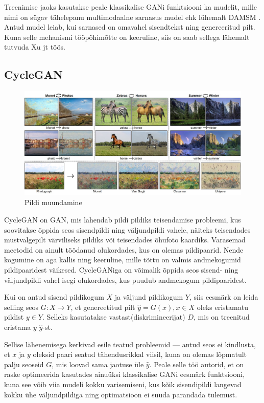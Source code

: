 \documentclass{vilgym}
\begin{document}
	Treenimise jaoks kasutakse peale klassikalise GANi funktsiooni ka mudelit, mille nimi on sügav tähelepanu multimodaalne sarnasus mudel ehk lühemalt DAMSM . Antud mudel leiab, kui sarnased on omavahel sisendtekst ning genereeritud pilt. Kuna selle mehanismi tööpõhimõtte on keeruline, siis on saab sellega lähemalt tutvuda Xu jt töös. \parencite{attngan}

	\subsection{CycleGAN}
	\begin{figure}
		\centering
			\includegraphics[width=\linewidth]{images/cyclegan.jpg}
			\caption{Pildi muundamine}
			\label{fig:cyclegan}
	\end{figure}


	CycleGAN on GAN, mis lahendab pildi pildiks teisendamise probleemi, kus soovitakse õppida seos sisendpildi ning väljundpildi vahele, näiteks teisendades mustvalgepilt värviliseks pildiks või teisendades õhufoto kaardiks. Varasemad meetodid on ainult töödanud olukordades, kus on olemas pildipaarid. Nende kogumine on aga kallis ning keeruline, mille tõttu on valmis andmekogumid pildipaaridest väikesed. CycleGANiga on võimalik õppida seos sisend- ning väljundpildi vahel isegi olukordades, kus puudub andmekogum pildipaaridest. 

	Kui on antud sisend pildikogum $ X $ ja väljund pildikogum $ Y $, siis eesmärk on leida selling seos $ G: X \rightarrow Y $, et genereetitud pilt $ \hat{y} = G(x), x \in X $ oleks eristamatu pildist $ y \in Y $. Selleks kasutatakse vastast(diskrimineerijat) $ D $, mis on treenitud eristama $ y $ $ \hat{y} $-st. 

	Sellise lähenemisega kerkivad esile teatud probleemid --- antud seos ei kindlusta, et $ x $ ja $ y $ oleksid paari seatud tähendusrikkal viisil, kuna on olemas lõpmatult palju seoseid $ G $, mis loovad sama jaotuse üle $ \hat{y} $. Peale selle töö autorid, et on raske optimeerida kasutades ainuüksi klassikalise GANi eesmärk funktsiooni, kuna see võib viia mudeli kokku varisemiseni, kus kõik sisendipildi langevad kokku ühe väljundpildiga ning optimatsioon ei suuda parandada tulemust.
\end{document}
